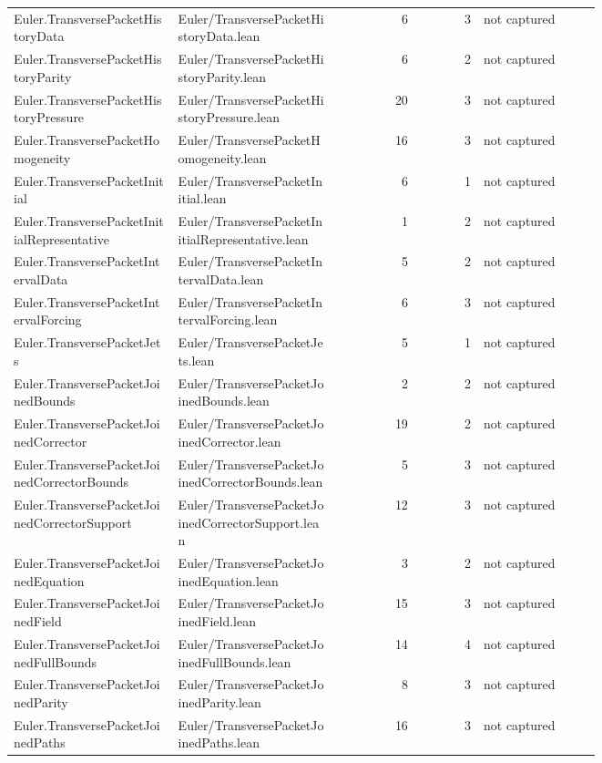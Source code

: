 \documentclass[10pt]{article}
\begin{document}
\begin{longtable}{p{0.28\linewidth}p{0.27\linewidth}r r p{0.20\linewidth}}
Euler.TransversePacketHistoryData & Euler/TransversePacketHistoryData.lean & 6 & 3 & not captured\\
Euler.TransversePacketHistoryParity & Euler/TransversePacketHistoryParity.lean & 6 & 2 & not captured\\
Euler.TransversePacketHistoryPressure & Euler/TransversePacketHistoryPressure.lean & 20 & 3 & not captured\\
Euler.TransversePacketHomogeneity & Euler/TransversePacketHomogeneity.lean & 16 & 3 & not captured\\
Euler.TransversePacketInitial & Euler/TransversePacketInitial.lean & 6 & 1 & not captured\\
Euler.TransversePacketInitialRepresentative & Euler/TransversePacketInitialRepresentative.lean & 1 & 2 & not captured\\
Euler.TransversePacketIntervalData & Euler/TransversePacketIntervalData.lean & 5 & 2 & not captured\\
Euler.TransversePacketIntervalForcing & Euler/TransversePacketIntervalForcing.lean & 6 & 3 & not captured\\
Euler.TransversePacketJets & Euler/TransversePacketJets.lean & 5 & 1 & not captured\\
Euler.TransversePacketJoinedBounds & Euler/TransversePacketJoinedBounds.lean & 2 & 2 & not captured\\
Euler.TransversePacketJoinedCorrector & Euler/TransversePacketJoinedCorrector.lean & 19 & 2 & not captured\\
Euler.TransversePacketJoinedCorrectorBounds & Euler/TransversePacketJoinedCorrectorBounds.lean & 5 & 3 & not captured\\
Euler.TransversePacketJoinedCorrectorSupport & Euler/TransversePacketJoinedCorrectorSupport.lean & 12 & 3 & not captured\\
Euler.TransversePacketJoinedEquation & Euler/TransversePacketJoinedEquation.lean & 3 & 2 & not captured\\
Euler.TransversePacketJoinedField & Euler/TransversePacketJoinedField.lean & 15 & 3 & not captured\\
Euler.TransversePacketJoinedFullBounds & Euler/TransversePacketJoinedFullBounds.lean & 14 & 4 & not captured\\
Euler.TransversePacketJoinedParity & Euler/TransversePacketJoinedParity.lean & 8 & 3 & not captured\\
Euler.TransversePacketJoinedPaths & Euler/TransversePacketJoinedPaths.lean & 16 & 3 & not captured\\

\end{longtable}
\end{document}
